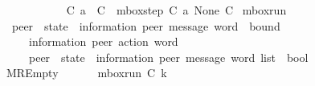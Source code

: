 \begin{isabellebody}
\ \ {\isacharparenleft}{\kern0pt}{\isachardoublequoteopen}{\isacharunderscore}{\kern0pt}\ {\isasymmidarrow}{\isasymlangle}{\isacharunderscore}{\kern0pt}{\isacharcomma}{\kern0pt}\ {\isasyminfinity}{\isasymrangle}{\isasymrightarrow}\ {\isacharunderscore}{\kern0pt}{\isachardoublequoteclose}\ {\isacharbrackleft}{\kern0pt}{}{}{\isacharcomma}{\kern0pt}\ {}{}{\isacharcomma}{\kern0pt}\ {}{}{\isacharbrackright}{\kern0pt}\ {}{}{}{\isacharparenright}{\kern0pt}\ \isanewline
\ \ {\isachardoublequoteopen}C{}\ {\isasymmidarrow}{\isasymlangle}a{\isacharcomma}{\kern0pt}\ {\isasyminfinity}{\isasymrangle}{\isasymrightarrow}\ C{}\ {\isasymequiv}\ mbox{\isacharunderscore}{\kern0pt}step\ C{}\ a\ None\ C{}{\isachardoublequoteclose}%
\isadelimdocument
%
\endisadelimdocument
%
\isatagdocument
%
\isamarkuptrue%
%
\endisatagdocument
{\isafolddocument}%
%
\isadelimdocument
%
\endisadelimdocument
{}\isamarkupfalse%
\ mbox{\isacharunderscore}{\kern0pt}run\isanewline
\ \ {\isacharcolon}{\kern0pt}{\isacharcolon}{\kern0pt}\ {\isachardoublequoteopen}{\isacharparenleft}{\kern0pt}{\isacharprime}{\kern0pt}peer\ {\isasymRightarrow}\ {\isacharparenleft}{\kern0pt}{\isacharprime}{\kern0pt}state\ {\isasymtimes}\ {\isacharparenleft}{\kern0pt}{\isacharprime}{\kern0pt}information{\isacharcomma}{\kern0pt}\ {\isacharprime}{\kern0pt}peer{\isacharparenright}{\kern0pt}\ message\ word{\isacharparenright}{\kern0pt}{\isacharparenright}{\kern0pt}\ {\isasymRightarrow}\ bound\ {\isasymRightarrow}\isanewline
\ \ \ \ \ \ {\isacharparenleft}{\kern0pt}{\isacharprime}{\kern0pt}information{\isacharcomma}{\kern0pt}\ {\isacharprime}{\kern0pt}peer{\isacharparenright}{\kern0pt}\ action\ word\ {\isasymRightarrow}\isanewline
\ \ \ \ \ \ {\isacharparenleft}{\kern0pt}{\isacharprime}{\kern0pt}peer\ {\isasymRightarrow}\ {\isacharparenleft}{\kern0pt}{\isacharprime}{\kern0pt}state\ {\isasymtimes}\ {\isacharparenleft}{\kern0pt}{\isacharprime}{\kern0pt}information{\isacharcomma}{\kern0pt}\ {\isacharprime}{\kern0pt}peer{\isacharparenright}{\kern0pt}\ message\ word{\isacharparenright}{\kern0pt}{\isacharparenright}{\kern0pt}\ list\ {\isasymRightarrow}\ bool{\isachardoublequoteclose}\ \isanewline
\ \ MREmpty{\isacharcolon}{\kern0pt}\ \ \ \ \ \ \ {\isachardoublequoteopen}mbox{\isacharunderscore}{\kern0pt}run\ C\ k\ {\isasymepsilon}\ {\isacharparenleft}{\kern0pt}{\isacharbrackleft}{\kern0pt}{\isacharbrackright}{\kern0pt}{\isacharparenright}{\kern0pt}{\isachardoublequoteclose}\ {\isacharbar}{\kern0pt}\isanewline

\end{isabellebody}
